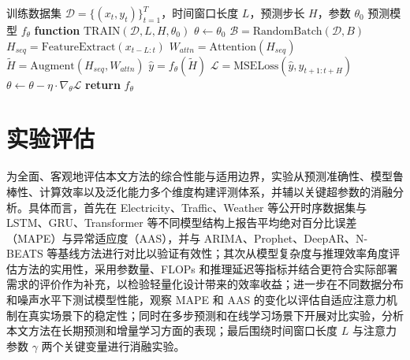 \begingroup
\renewcommand{\algorithmicrequire}{\textbf{输入：}}
\renewcommand{\algorithmicensure}{\textbf{输出：}}
\renewcommand{\algorithmicend}{\textbf{end}}
\renewcommand{\algorithmicfor}{\textbf{for}}
\renewcommand{\algorithmicdo}{\textbf{do}}
\renewcommand{\algorithmicif}{\textbf{if}}
\renewcommand{\algorithmicthen}{\textbf{then}}
\begin{algorithm}[H]
  \captionsetup{justification=raggedright,singlelinecheck=false}
  \caption{基于注意力机制的自适应时序预测方法}
  \label{alg:ch3-hvs-backdoor}
  \begin{algorithmic}[1]
    \Require 训练数据集 $\mathcal{D} = \{(x_{t}, y_{t})\}_{t = 1}^{T}$，时间窗口长度 $L$，预测步长 $H$，参数 $\theta_{0}$
    \Ensure 预测模型 $f_{\theta}$
    \State \textbf{function} $\text{TRAIN}(\mathcal{D}, L, H, \theta_{0})$
    \State $\theta \leftarrow \theta_{0}$
      \State $\mathcal{B} = \text{RandomBatch}(\mathcal{D}, B)$ 
        \State $H_{seq} = \text{FeatureExtract}(x_{t-L:t})$ 
        \State $W_{attn} = \text{Attention}(H_{seq})$ 
        \State $\widetilde{H} = \text{Augment}(H_{seq}, W_{attn})$ 
        \State $\widehat{y} = f_{\theta}(\widetilde{H})$ 
        \State $\mathcal{L} = \text{MSELoss}(\widehat{y}, y_{t+1:t+H})$ 
        \State $\theta \leftarrow \theta - \eta \cdot \nabla_{\theta}\mathcal{L}$ 
      \EndFor
    \EndFor
    \State \textbf{return} $f_{\theta}$
  \end{algorithmic}
\end{algorithm}
\endgroup


\section{实验评估}\label{ux5b9eux9a8cux8bc4ux4f30}

为全面、客观地评估本文方法的综合性能与适用边界，实验从预测准确性、模型鲁棒性、计算效率以及泛化能力多个维度构建评测体系，并辅以关键超参数的消融分析。具体而言，首先在 Electricity、Traffic、Weather 等公开时序数据集与 LSTM、GRU、Transformer 等不同模型结构上报告平均绝对百分比误差（MAPE）与异常适应度（AAS），并与 ARIMA、Prophet、DeepAR、N-BEATS 等基线方法进行对比以验证有效性；其次从模型复杂度与推理效率角度评估方法的实用性，采用参数量、FLOPs 和推理延迟等指标并结合更符合实际部署需求的评价作为补充，以检验轻量化设计带来的效率收益；进一步在不同数据分布和噪声水平下测试模型性能，观察 MAPE 和 AAS 的变化以评估自适应注意力机制在真实场景下的稳定性；同时在多步预测和在线学习场景下开展对比实验，分析本文方法在长期预测和增量学习方面的表现；最后围绕时间窗口长度 \(L\) 与注意力参数 \(\gamma\) 两个关键变量进行消融实验。

